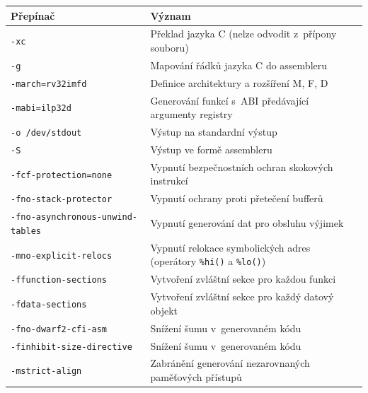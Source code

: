 \begin{table}[]
\begin{tabular}{|l|p{8cm}|}
\hline
Přepínač                        & Význam                                                                \\ \hline\hline
\texttt{-xc}                             & Překlad jazyka C (nelze odvodit z~přípony souboru)                    \\ \hline
\texttt{-g} & Mapování řádků jazyka C do assembleru \\ \hline
\texttt{-march=rv32imfd}                 & Definice architektury a rozšíření M, F, D                             \\ \hline
\texttt{-mabi=ilp32d}                    & Generování funkcí s~ABI předávající argumenty registry                \\ \hline
\texttt{-o /dev/stdout}                  & Výstup na standardní výstup                                           \\ \hline
\texttt{-S}                              & Výstup ve formě assembleru                                            \\ \hline
\texttt{-fcf-protection=none}            & Vypnutí bezpečnostních ochran skokových instrukcí                     \\ \hline
\texttt{-fno-stack-protector}            & Vypnutí ochrany proti přetečení bufferů                               \\ \hline
\texttt{-fno-asynchronous-unwind-tables} & Vypnutí generování dat pro obsluhu výjimek                            \\ \hline
\texttt{-mno-explicit-relocs}            & Vypnutí relokace symbolických adres (operátory \texttt{\%hi()} a \texttt{\%lo()})       \\ \hline
\texttt{-ffunction-sections}             & Vytvoření zvláštní sekce pro každou funkci                            \\ \hline
\texttt{-fdata-sections}                 & Vytvoření zvláštní sekce pro každý datový objekt                      \\ \hline
\texttt{-fno-dwarf2-cfi-asm}             & Snížení šumu v~generovaném kódu                                       \\ \hline
\texttt{-finhibit-size-directive}        & Snížení šumu v~generovaném kódu                                       \\ \hline
\texttt{-mstrict-align}                  & Zabránění generování nezarovnaných paměťových přístupů                \\ \hline

\end{tabular}
\end{table}
